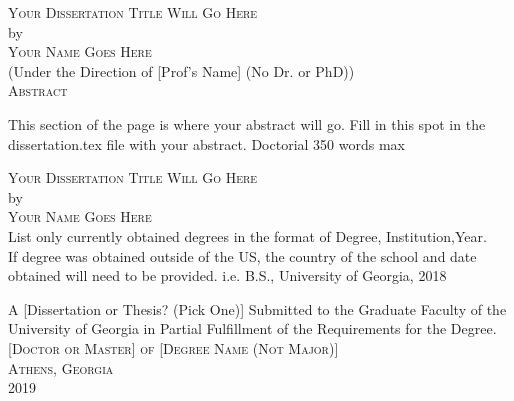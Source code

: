 \documentclass[12pt, notitlepage ]{report}
\begin{document}

\newcommand{\doctitle}{Your Dissertation Title Will Go Here}
\newcommand{\docauthor}{Your Name Goes Here}



\newpage
{}

\thispagestyle{empty}
\vspace*{18pt}
\begin{center}
  \textsc{\large{\doctitle}}\\[18pt]  %
  by\\[18pt]
  \textsc{\docauthor}\\[12pt]
  (Under the Direction of [Prof's Name] (No Dr. or PhD))\\[12pt]
  \textsc{Abstract}
\end{center}

This section of the page is where your abstract will go. Fill in this spot in the dissertation.tex file with your abstract. Doctorial 350 words max

\thispagestyle{empty}

\begin{list}{\textsc{Index words:\hfill}}{\leftmargin 1.4in}
  \item \begin{flushleft}
  \end{flushleft}
\end{list}


\newpage
\vspace*{18pt}
\begin{center}
  \textsc{\doctitle}\\[18pt]
  by\\[12pt]
  \textsc{\docauthor}\\[8pt]
  List only currently obtained degrees in the format of Degree, Institution,Year.\\
  If degree was obtained outside of the US, the country of the school and date obtained will need to be provided. i.e. B.S., University of Georgia, 2018

  \vfill
  A [Dissertation or Thesis? (Pick One)] Submitted to the Graduate Faculty of the\\ University of Georgia in Partial Fulfillment of the Requirements for the Degree.\\ [18pt]

  \textsc{[Doctor or Master] of [Degree Name (Not Major)]}\\[24pt]
  \textsc{Athens, Georgia}\\[18pt]
  2019
\end{center}
\end{document}
